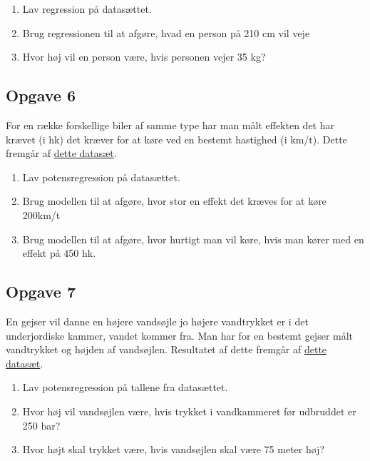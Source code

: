 \begin{enumerate}[label=\roman*)]
	\item Lav regression på datasættet.
	\item Brug regressionen til at afgøre, hvad en person på 210 cm vil veje
	\item Hvor høj vil en person være, hvis personen vejer 35 kg?
\end{enumerate}

\subsection*{Opgave 6}
For en række forskellige biler af samme type har man målt effekten det har krævet (i hk) det kræver for at køre ved en bestemt hastighed (i km/t). Dette fremgår af \href{https://github.com/ChristianJLex/TeachingNotes/raw/master/2023-2024/Data og lign/hk.xlsx}{\color{blue!60} dette datasæt}.

\begin{enumerate}[label=\roman*)]
	\item Lav potensregression på datasættet.
	\item Brug modellen til at afgøre, hvor stor en effekt det kræves for at køre 200km/t
	\item Brug modellen til at afgøre, hvor hurtigt man vil køre, hvis man kører med en effekt 
	på 450 hk.
\end{enumerate}

\subsection*{Opgave 7}

En gejser vil danne en højere vandsøjle jo højere vandtrykket er i det underjordiske kammer, vandet kommer fra. Man har for en bestemt gejser målt vandtrykket og højden af vandsøjlen. Resultatet af dette fremgår af \href{https://github.com/ChristianJLex/TeachingNotes/raw/master/2023-2024/Data og lign/Gejser.xlsx}{\color{blue!60} dette datasæt}.

\begin{enumerate}[label=\roman*)]
	\item Lav potensregression på tallene fra datasættet.
	\item Hvor høj vil vandsøjlen være, hvis trykket i vandkammeret før udbruddet er 250 bar?
	\item Hvor højt skal trykket være, hvis vandsøjlen skal være 75 meter høj?
\end{enumerate}

